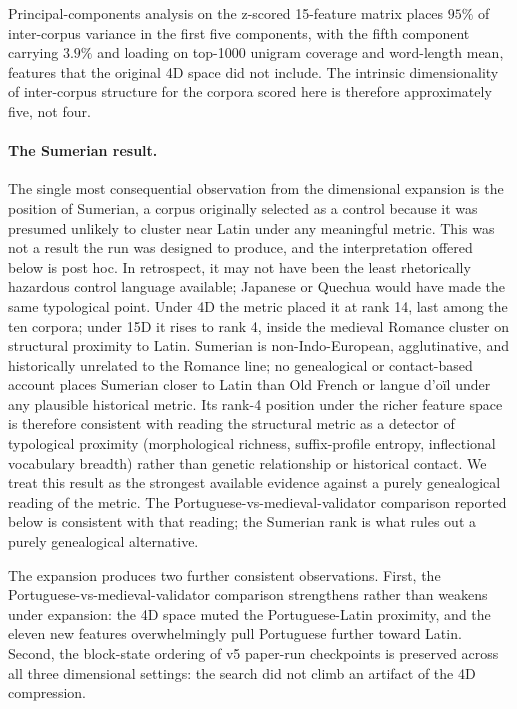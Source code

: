 \documentclass[11pt]{article}
\begin{document}
Principal-components analysis on the z-scored 15-feature matrix places
$95\%$ of inter-corpus variance in the first five components, with the
fifth component carrying $3.9\%$ and loading on top-1000 unigram coverage
and word-length mean, features that the original 4D space did not include.
The intrinsic dimensionality of inter-corpus structure for the corpora
scored here is therefore approximately five, not four.

\paragraph{The Sumerian result.}
The single most consequential observation from the dimensional expansion
is the position of Sumerian, a corpus originally selected as a control
because it was presumed unlikely to cluster near Latin under any meaningful
metric. This was not a result the run was designed to produce, and the
interpretation offered below is post hoc. In retrospect, it may not have
been the least rhetorically hazardous control language available; Japanese
or Quechua would have made the same typological point. Under 4D the metric placed it at rank 14,
last among the ten corpora; under 15D it rises to rank 4, inside the
medieval Romance cluster on structural proximity to Latin. Sumerian is
non-Indo-European, agglutinative, and historically unrelated to the
Romance line; no genealogical or contact-based account places Sumerian
closer to Latin than Old French or langue d'o\"il under any plausible
historical metric. Its rank-4 position under the richer feature space
is therefore consistent with reading the structural metric as a detector
of typological proximity (morphological richness, suffix-profile entropy,
inflectional vocabulary breadth) rather than genetic relationship or
historical contact. We treat this result as the strongest available
evidence against a purely genealogical reading of the metric. The
Portuguese-vs-medieval-validator comparison reported below is consistent
with that reading; the Sumerian rank is what rules out a purely
genealogical alternative.

The expansion produces two further consistent observations. First, the
Portuguese-vs-medieval-validator comparison strengthens rather than
weakens under expansion: the 4D space muted the Portuguese-Latin
proximity, and the eleven new features overwhelmingly pull Portuguese
further toward Latin. Second, the block-state ordering of v5 paper-run
checkpoints is preserved across all three dimensional settings: the
search did not climb an artifact of the 4D compression.
\end{document}
